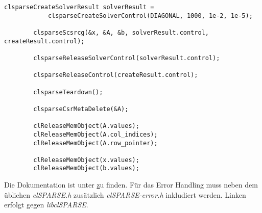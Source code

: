 		\begin{lstlisting}[caption=clSPARSE: Ausführen]
		clsparseCreateSolverResult solverResult = 
			clsparseCreateSolverControl(DIAGONAL, 1000, 1e-2, 1e-5);
		
		clsparseScsrcg(&x, &A, &b, solverResult.control, createResult.control);
		
		clsparseReleaseSolverControl(solverResult.control);
    
		clsparseReleaseControl(createResult.control);
		
		clsparseTeardown();  
		  
		clsparseCsrMetaDelete(&A);
		
		clReleaseMemObject(A.values);
		clReleaseMemObject(A.col_indices);
		clReleaseMemObject(A.row_pointer);

		clReleaseMemObject(x.values);
		clReleaseMemObject(b.values);
        	\end{lstlisting}
    	
    	    Die Dokumentation ist unter \href{http://clmathlibraries.github.io/clSPARSE/} zu finden. Für das Error Handling muss neben dem üblichen \textit{clSPARSE.h} zusätzlich \textit{clSPARSE-error.h} inkludiert werden. Linken erfolgt gegen \textit{libclSPARSE}.
			